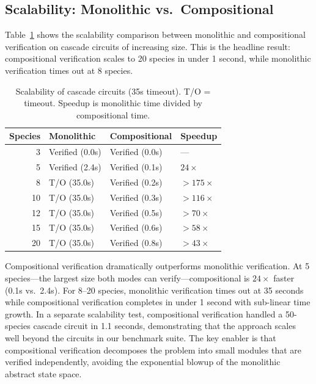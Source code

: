\documentclass[11pt]{article}
\begin{document}
\subsection{Scalability: Monolithic vs.\ Compositional}
\label{sec:scalability}

Table~\ref{tab:scalability} shows the scalability comparison between
monolithic and compositional verification on cascade circuits of
increasing size. This is the headline result: compositional
verification scales to 20 species in under 1 second, while monolithic
verification times out at 8 species.

\begin{table}[t]
\centering
\caption{Scalability of cascade circuits (35s timeout). T/O = timeout.
  Speedup is monolithic time divided by compositional time.}
\label{tab:scalability}
\small
\begin{tabular}{rlll}
\toprule
\textbf{Species} & \textbf{Monolithic} & \textbf{Compositional} & \textbf{Speedup} \\
\midrule
 3 & Verified (0.0s)  & Verified (0.0s) & --- \\
 5 & Verified (2.4s)  & Verified (0.1s) & $24\times$ \\
 8 & T/O (35.0s)      & Verified (0.2s) & $>175\times$ \\
10 & T/O (35.0s)      & Verified (0.3s) & $>116\times$ \\
12 & T/O (35.0s)      & Verified (0.5s) & $>70\times$ \\
15 & T/O (35.0s)      & Verified (0.6s) & $>58\times$ \\
20 & T/O (35.0s)      & Verified (0.8s) & $>43\times$ \\
\bottomrule
\end{tabular}
\end{table}

Compositional verification dramatically outperforms monolithic
verification. At 5 species---the largest size both modes can
verify---compositional is $24\times$ faster (0.1s vs.\ 2.4s). For
8--20 species, monolithic verification times out at 35 seconds
while compositional verification completes in under 1 second with
sub-linear time growth. In a separate scalability test, compositional
verification handled a 50-species cascade circuit in 1.1 seconds,
demonstrating that the approach scales well beyond the circuits
in our benchmark suite. The key enabler is that compositional
verification decomposes the problem into small modules that are
verified independently, avoiding the exponential blowup of the
monolithic abstract state space.
\end{document}
